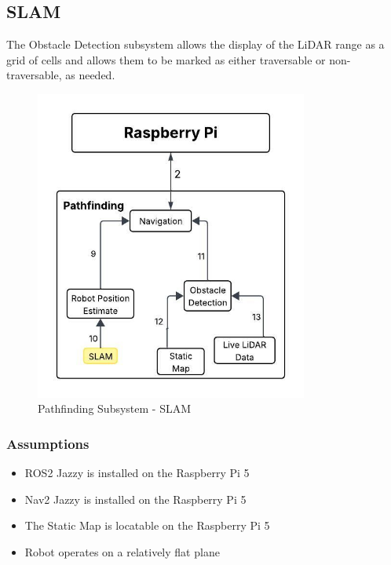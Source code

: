 \newpage

\subsection{SLAM}
The Obstacle Detection subsystem allows the display of the LiDAR range as a grid of cells and allows them to be marked as either traversable or non-traversable, as needed.





\begin{figure}[h!]
	\centering
 	\includegraphics[width=0.80\textwidth]{images/pathfinding 2/Data_Flow_SLAM.jpeg}
 \caption{Pathfinding Subsystem - SLAM} %
\end{figure}

\subsubsection{Assumptions}
\begin{itemize}
    \item ROS2 Jazzy is installed on the Raspberry Pi 5
    \item Nav2 Jazzy is installed on the Raspberry Pi 5
    \item The Static Map is locatable on the Raspberry Pi 5
    \item Robot operates on a relatively flat plane
\end{itemize}

